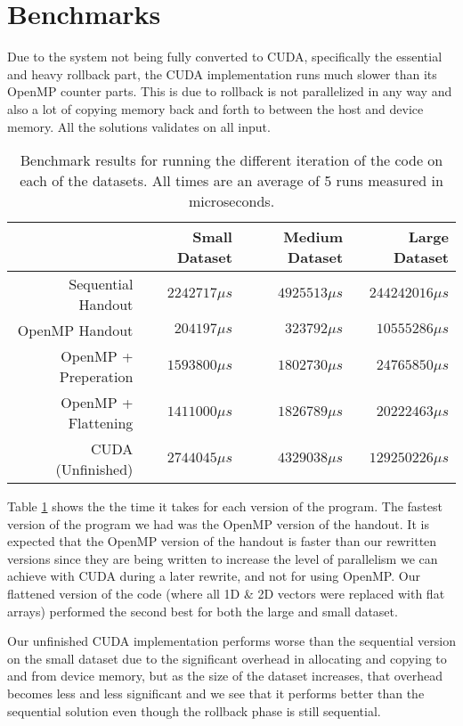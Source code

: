 \section{Benchmarks}

Due to the system not being fully converted to CUDA, specifically the essential
and heavy rollback part, the CUDA implementation runs much slower than its
OpenMP counter parts. This is due to rollback is not parallelized in any way and
also a lot of copying memory back and forth to between the host and device
memory. All the solutions validates on all input.

\begin{table}[H]
    \centering
    \begin{tabular}{r|r|r|r}
                             &  Small Dataset & Medium Dataset &    Large Dataset \\ \hline
        Sequential Handout   & $2242717\mu s$ & $4925513\mu s$ & $244242016\mu s$ \\
        OpenMP Handout       &  $204197\mu s$ &  $323792\mu s$ &  $10555286\mu s$ \\
        OpenMP + Preperation & $1593800\mu s$ & $1802730\mu s$ &  $24765850\mu s$ \\
        OpenMP + Flattening  & $1411000\mu s$ & $1826789\mu s$ &  $20222463\mu s$ \\
        CUDA (Unfinished)    & $2744045\mu s$ & $4329038\mu s$ & $129250226\mu s$ \\
    \end{tabular}
    \caption{Benchmark results for running the different iteration of the code
        on each of the datasets. All times are an average of 5 runs measured in
        microseconds.}
    \label{tab:benchmarks}
\end{table}

Table \ref{tab:benchmarks} shows the the time it takes for each version of the
program. The fastest version of the program we had was the OpenMP version of
the handout. It is expected that the OpenMP version of the handout is faster
than our rewritten versions since they are being written to increase the level
of parallelism we can achieve with CUDA during a later rewrite, and not for
using OpenMP. Our flattened version of the code (where all 1D \& 2D vectors were
replaced with flat arrays) performed the second best for both the large and
small dataset.

Our unfinished CUDA implementation performs worse than the sequential version on
the small dataset due to the significant overhead in allocating and copying to
and from device memory, but as the size of the dataset increases, that overhead
becomes less and less significant and we see that it performs better than the
sequential solution even though the rollback phase is still sequential.



